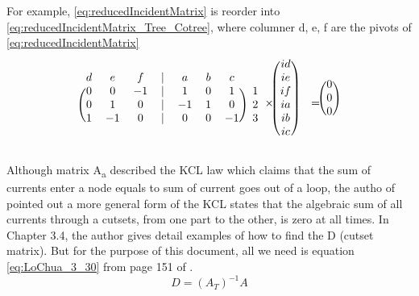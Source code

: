 \documentclass[conference]{IEEEtran}
\begin{document}
For example, \ref{eq:reducedIncidentMatrix} is reorder into \ref{eq:reducedIncidentMatrix_Tree_Cotree}, where columner d, e, f are the pivots of \ref{eq:reducedIncidentMatrix}
\begin{equation}
  \begin{array}{c@{}c@{}c@{}c@{}c}  %
  \begin{blockarray}{cccccccc}
  d & e & f & | & a & b & c \\
  \begin{block}{(ccccccc)c}
    0 & 0 & -1 & | &  1 & 0 & 1 &  1 \\
    0 & 1 & 0 &  | & -1 & 1 & 0 & 2 \\
    1 & -1 & 0 & | & 0 & 0 & -1 & 3 \\
  \end{block}
  \end{blockarray}
  &
  \times
  &
  \begin{blockarray}{cc}
  \begin{block}{(c)c}
    id & \\
    ie & \\
    if & \\ 
    ia & \\
    ib & \\ 
    ic & \\
  \end{block}
  \end{blockarray}
  & 
  =
  &
  \begin{blockarray}{c}
  \begin{block}{(c)}
    0\\
    0\\
    0\\
  \end{block}
  \end{blockarray}
  \end{array}
  \label{eq:reducedIncidentMatrix_Tree_Cotree}
\end{equation}


Although matrix A\textsubscript{a} described the KCL law which claims that the sum of currents enter a node equals to sum of current goes
out of a loop, the autho of \cite{LOChua} pointed out a more general form of the KCL states that the algebraic sum of all currents through a
cutsets, from one part to the other, is zero at all times. In Chapter 3.4, the author gives detail examples of how to find the D (cutset matrix).
But for the purpose of this document, all we need is equation \ref{eq:LoChua_3_30} from page 151 of \cite{LOChua}.
\begin{equation}
  D = (A_T)^{-1} A 
  \label{eq:LoChua_3_30}
\end{equation}
\end{document}

